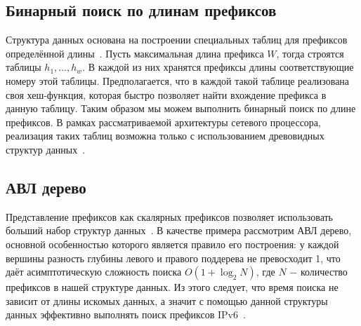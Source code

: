 \documentclass[conference]{IEEEtran}
\begin{document}
        \subsection{Бинарный поиск по длинам префиксов}
            Структура данных основана на построении специальных таблиц для префиксов определённой длины~\cite{mun2006binary}. Пусть максимальная длина префикса {\ttfamily $W$}, 
            тогда строятся таблицы {\ttfamily $h_{1},\ldots,h_{w}$}. В каждой из них хранятся префиксы длины соответствующие номеру этой таблицы. Предполагается, 
            что в каждой такой таблице реализована своя хеш-функция, которая быстро позволяет найти вхождение префикса в данную таблицу.
            Таким образом мы можем выполнить бинарный поиск по длине префиксов. В рамках рассматриваемой архитектуры сетевого процессора, реализация таких таблиц возможна только
            с использованием древовидных структур данных~\cite{mun2006binary}. 
        
        \subsection{АВЛ дерево}
            \label{section:avlrev}
            Представление префиксов как скалярных префиксов позволяет использовать больший набор структур данных~\cite{behdadfar2009scalar}. 
            В качестве примера рассмотрим АВЛ дерево, основной особенностью которого является правило его построения: у каждой вершины разность 
            глубины левого и правого поддерева не превосходит 1, что даёт асимптотическую сложность поиска {\ttfamily $O(1+\log_2{N})$}, 
            где {\ttfamily $N$} $-$ количество префиксов в нашей структуре данных. Из этого следует, что время поиска не зависит от длины искомых данных,
            а значит с помощью данной структуры данных эффективно выполнять поиск префиксов IPv6~\cite{behdadfar2011coded}.
            \\
\end{document}
